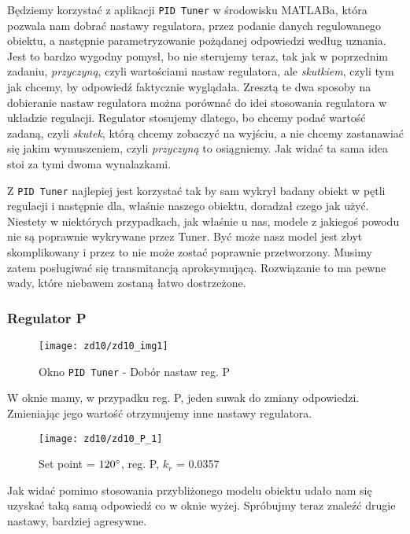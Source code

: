 \documentclass[11 pt]{article}
\begin{document}
Będziemy korzystać z aplikacji \texttt{PID Tuner} w środowisku MATLABa, która pozwala nam dobrać nastawy regulatora, przez podanie danych regulowanego obiektu, a następnie parametryzowanie pożądanej odpowiedzi według uznania. Jest to bardzo wygodny pomysł, bo nie sterujemy teraz, tak jak w poprzednim zadaniu, \textit{przyczyną}, czyli wartościami nastaw regulatora, ale \textit{skutkiem}, czyli tym jak chcemy, by odpowiedź faktycznie wyglądała. Zresztą te dwa sposoby na dobieranie nastaw regulatora można porównać do idei stosowania regulatora w układzie regulacji. Regulator stosujemy dlatego, bo chcemy podać wartość zadaną, czyli \textit{skutek}, którą chcemy zobaczyć na wyjściu, a nie chcemy zastanawiać się jakim wymuszeniem, czyli \textit{przyczyną} to osiągniemy. Jak widać ta sama idea stoi za tymi dwoma wynalazkami.

Z \texttt{PID Tuner} najlepiej jest korzystać tak by sam wykrył badany obiekt w pętli regulacji i następnie dla, właśnie naszego obiektu, doradzał czego jak użyć. Niestety w niektórych przypadkach, jak właśnie u nas, modele z jakiegoś powodu nie są poprawnie wykrywane przez Tuner. Być może nasz model jest zbyt skomplikowany i przez to nie może zostać poprawnie przetworzony. Musimy zatem posługiwać się transmitancją aproksymującą. Rozwiązanie to ma pewne wady, które niebawem zostaną łatwo dostrzeżone.

\subsubsection*{Regulator P}

\begin{figure}[h!]
	\centerline{
		\texttt{[image: zd10/zd10\_img1]}
	}
	\caption{Okno \texttt{PID Tuner} - Dobór nastaw reg. P}
\end{figure}

W oknie mamy, w przypadku reg. P, jeden suwak do zmiany odpowiedzi. Zmieniając jego wartość otrzymujemy inne nastawy regulatora.

\newpage

\begin{figure}[h!]
	\centerline{
		\texttt{[image: zd10/zd10\_P\_1]}
	}
	\caption{Set point = $120 \degree$, reg. P, $k_r$ = 0.0357}
\end{figure}

Jak widać pomimo stosowania przybliżonego modelu obiektu udało nam się uzyskać taką samą odpowiedź co w oknie wyżej. Spróbujmy teraz znaleźć drugie nastawy, bardziej agresywne.
\end{document}
